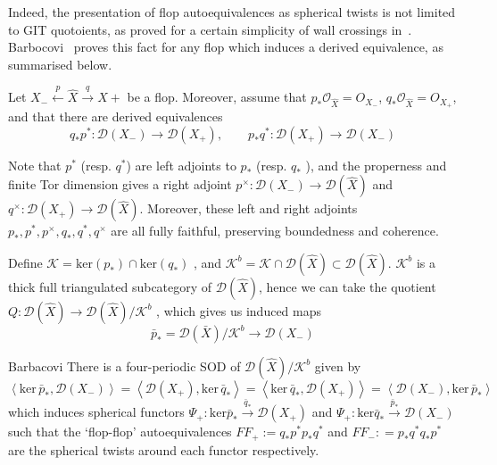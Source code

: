 Indeed, the presentation of flop autoequivalences as spherical twists is not limited to GIT quotoients, as proved for a certain simplicity of wall crossings in~\cite{halpernleistner2016autoequivalences}. Barbocovi~\cite{barbacovi_spherical_2021} proves this fact for any flop which induces a derived equivalence, as summarised below.

Let $X_{-}\xleftarrow{p} \hat{X} \xrightarrow{q} X+$ be a flop. Moreover, assume that $p_{*}\mathcal{O}_{\hat{X}}= O_{X_-}$, $q_{*}\mathcal{O}_{\hat{X}}= O_{X_+}$,  and that there are derived equivalences$$
q_{*}p^{*}: \mathcal{D}(X_{-})\to \mathcal{D}(X_{+}), \qquad p_{*}q^{*}: \mathcal{D}(X_{+})\to \mathcal{D}(X_{-})
$$

Note that $p^*$ (resp. $q^{*}$) are left adjoints to $p_*$ (resp. $q_{*}$ ), and the properness and finite Tor dimension gives a right adjoint $p^{\times}: \mathcal{D}(X_{-})\to \mathcal{D}(\hat{X})$ and $q^{\times}: \mathcal{D}(X_{+})\to \mathcal{D}(\hat{X})$. Moreover, these left and right adjoints $p_{*}, p^{*} ,p^{\times}, q_{*}, q^{*},q^{\times}$ are all fully faithful, preserving boundedness and coherence.  

Define $\mathcal{K} = \mathrm{ker}(p_{*}) \cap \mathrm{ker}(q_{*})$ , and $\mathcal{ K}^{b}= \mathcal{K} \cap \mathcal{D}(\hat{X}) \subset \mathcal{D}(\hat{X})$. $\mathcal{K}^b$  is a thick full triangulated subcategory of $\mathcal{D}(\hat{X})$, hence we can take the quotient $Q: \mathcal{D}(\hat{X})\to \mathcal{D}(\hat{X})/\mathcal{K}^b$ , which gives us  induced maps
$$\bar{p}_{*} = \mathcal{D}(\bar{ X})/ \mathcal{K}^{b}\to \mathcal{D}(X_{-})$$

\begin{theorem}{Barbacovi}{}
There is a  four-periodic SOD of $\mathcal{D}(\hat{X})/\mathcal{K}^b$ given by $$
\left< \mathrm{ker}\,\bar{p}_{*},\mathcal{D}(X_{-}) \right> =  \left< \mathcal{D}(X_{+}), \mathrm{ker}\,\bar{q}_{*} \right> = \left< \mathrm{ker}\,\bar{q}_{*} , \mathcal{D}(X_{+})\right> = \left< \mathcal{D}(X_{-}), \mathrm{ker}\,\bar{p}_{*} \right>  
$$ which induces spherical functors $\Psi_{+}: \mathrm{ker} \bar{p}_{*}\xrightarrow{\bar{q}_{*}}\mathcal{D}(X_+)$ and $\Psi_{+}: \mathrm{ker} \bar{q}_{*}\xrightarrow{\bar{p}_{*}}\mathcal{D}(X_-)$ such that the `flop-flop' autoequivalences $FF _{+}:= q_{*}p^{*}p_{*}q^{*}$ and $F F_{-}: = p_{*}q^{*}q_{*}p^*$ are the spherical twists around each functor respectively.
\end{theorem}

